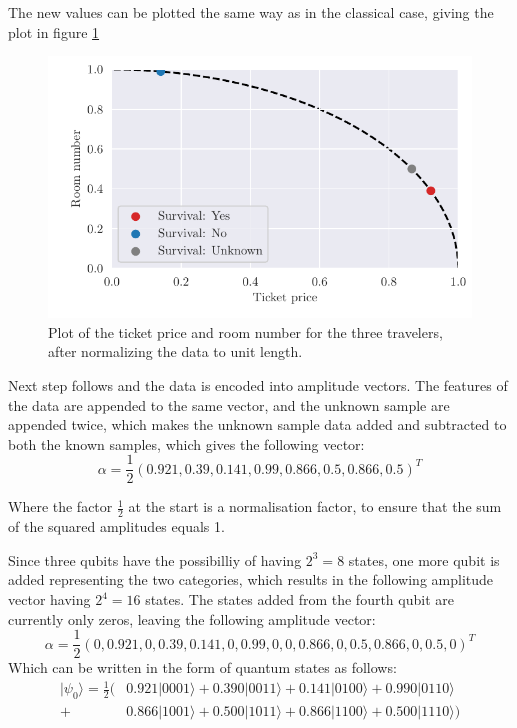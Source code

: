 \documentclass[../main.tex]{subfiles}
\begin{document}
The new values can be plotted the same way as in the classical case, giving the plot in figure \ref{fig:knn_qua}

\begin{figure}[ht]
    \centering
    \includegraphics{figures/Cqnn.pdf}
    \caption{Plot of the ticket price and room number for the three travelers, after normalizing the data to unit length.}
    \label{fig:knn_qua}
\end{figure}

Next step follows and the data is encoded into amplitude vectors. The features of the data are appended to the same vector, and the unknown sample are appended twice, which makes the unknown sample data added and subtracted to both the known samples, which gives the following vector:
\begin{equation}
\alpha=\frac{1}{2}(0.921, 0.39, 0.141, 0.99, 0.866, 0.5, 0.866, 0.5)^T
\end{equation}

Where the factor \ensuremath{\frac{1}{2}} at the start is a normalisation factor, to ensure that the sum of the squared amplitudes equals 1. 

Since three qubits have the possibilliy of having \ensuremath{2^3=8} states, one more qubit is added representing the two categories, which results in the following amplitude vector having \ensuremath{2^4=16} states. The states added from the fourth qubit are currently only zeros, leaving the following amplitude vector:
\begin{equation}
\alpha=\frac{1}{2}(0, 0.921, 0, 0.39, 0.141, 0, 0.99, 0, 0, 0.866, 0, 0.5, 0.866, 0, 0.5, 0)^T
\end{equation}
Which can be written in the form of quantum states as follows:
\begin{equation}
\begin{split}
|\psi_{0}\rangle=\frac{1}{2}(&0.921|0001\rangle+0.390|0011\rangle+0.141|0100\rangle+0.990|0110\rangle\\+&0.866|1001\rangle
+0.500|1011\rangle+0.866|1100\rangle+0.500|1110\rangle)
\end{split}
\end{equation}
\end{document}
